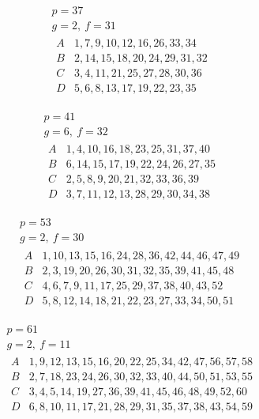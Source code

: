 %
\[
\begin{gathered}
p=37\\
g=2,\ f=31\\[3pt]
\begin{array}{c|l}
A&1,7,9,10,12,16,26,33,34\\
B&2,14,15,18,20,24,29,31,32\\
C&3,4,11,21,25,27,28,30,36\\
D&5,6,8,13,17,19,22,23,35
\end{array}
\end{gathered}
\]

\[
\begin{gathered}
p=41\\
g=6,\ f=32\\[3pt]
\begin{array}{c|l}
A&1,4,10,16,18,23,25,31,37,40\\
B&6,14,15,17,19,22,24,26,27,35\\
C&2,5,8,9,20,21,32,33,36,39\\
D&3,7,11,12,13,28,29,30,34,38
\end{array}
\end{gathered}
\]

\[
\begin{gathered}
p=53\\
g=2,\ f=30\\[3pt]
\begin{array}{c|l}
A&1,10,13,15,16,24,28,36,42,44,46,47,49\\
B&2,3,19,20,26,30,31,32,35,39,41,45,48\\
C&4,6,7,9,11,17,25,29,37,38,40,43,52\\
D&5,8,12,14,18,21,22,23,27,33,34,50,51
\end{array}
\end{gathered}
\]

\[
\begin{gathered}
p=61\\
g=2,\ f=11\\[3pt]
\begin{array}{c|l}
A&1,9,12,13,15,16,20,22,25,34,42,47,56,57,58\\
B&2,7,18,23,24,26,30,32,33,40,44,50,51,53,55\\
C&3,4,5,14,19,27,36,39,41,45,46,48,49,52,60\\
D&6,8,10,11,17,21,28,29,31,35,37,38,43,54,59
\end{array}
\end{gathered}
\]

